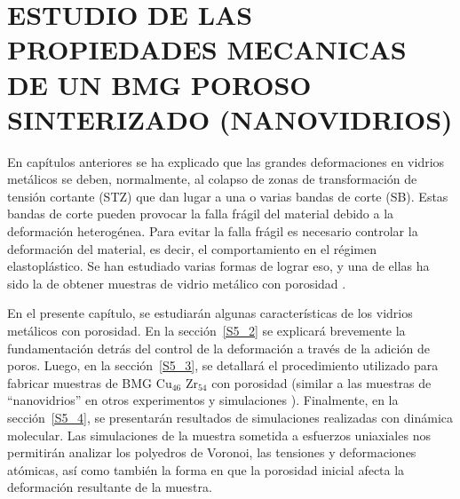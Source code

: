 
\chapter{ESTUDIO DE LAS PROPIEDADES MECANICAS DE UN BMG POROSO SINTERIZADO (NANOVIDRIOS)} %

\label{C5} %





En capítulos anteriores se ha explicado que las grandes deformaciones en vidrios metálicos se deben, normalmente,
al colapso de zonas de transformación de tensión cortante (STZ) que dan lugar a una o varias bandas de corte (SB).
Estas bandas de corte pueden provocar la falla frágil del material debido a la deformación heterogénea.
Para evitar la falla frágil es necesario controlar la deformación del material, es decir, el comportamiento en el régimen elastoplástico.
Se han estudiado varias formas de lograr eso, y una de ellas ha sido la de obtener muestras de vidrio metálico con porosidad 
\citep{guan13,wang10,schuh07,liontas14}.

En el presente capítulo, se estudiarán algunas características de los vidrios metálicos con porosidad. En la sección~\ref{S5_2} se explicará
brevemente la fundamentación detrás del control de la deformación a través de la adición de poros.
Luego, en la sección~\ref{S5_3}, se detallará el procedimiento utilizado para fabricar muestras de BMG Cu$_{46}$ Zr$_{54}$ con porosidad
(similar a las muestras de ``nanovidrios'' en otros experimentos y simulaciones \citep{adibi13,albe13}). Finalmente, en la sección~\ref{S5_4},
se presentarán resultados de simulaciones
realizadas con dinámica molecular. Las simulaciones de la muestra sometida a esfuerzos uniaxiales nos permitirán analizar los polyedros
de Voronoi, las tensiones y deformaciones atómicas, así como también la forma en que la porosidad inicial afecta la deformación resultante
de la muestra.

